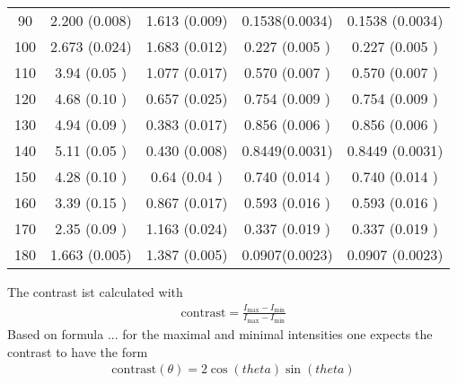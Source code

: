 \begin{table}[H]
\begin{tabular}{S S S S S}
		90                            & 2.200 (0.008)                 & 1.613 (0.009)                 & 0.1538(0.0034) & 0.1538 (0.0034) \\
		100                           & 2.673 (0.024)                 & 1.683 (0.012)                 & 0.227 (0.005 ) & 0.227 (0.005 )  \\
		110                           & 3.94  (0.05 )                 & 1.077 (0.017)                 & 0.570 (0.007 ) & 0.570 (0.007 )  \\
		120                           & 4.68  (0.10 )                 & 0.657 (0.025)                 & 0.754 (0.009 ) & 0.754 (0.009 )  \\
		130                           & 4.94  (0.09 )                 & 0.383 (0.017)                 & 0.856 (0.006 ) & 0.856 (0.006 )  \\
		140                           & 5.11  (0.05 )                 & 0.430 (0.008)                 & 0.8449(0.0031) & 0.8449 (0.0031) \\
		150                           & 4.28  (0.10 )                 & 0.64  (0.04 )                 & 0.740 (0.014 ) & 0.740 (0.014 )  \\
		160                           & 3.39  (0.15 )                 & 0.867 (0.017)                 & 0.593 (0.016 ) & 0.593 (0.016 )  \\
		170                           & 2.35  (0.09 )                 & 1.163 (0.024)                 & 0.337 (0.019 ) & 0.337 (0.019 )  \\
		180                           & 1.663 (0.005)                 & 1.387 (0.005)                 & 0.0907(0.0023) & 0.0907 (0.0023) \\
        
	\end{tabular}

\end{table}

The contrast ist calculated with
\begin{align}
    \text{contrast} = \frac{I_\text{max} -I_\text{min}}{I_\text{max}-I_\text{min}}
\end{align}
Based on formula ... for the maximal and minimal intensities one expects the contrast to have the form
\begin{align}
    \text{contrast}(\theta) = 2\cos(theta)\sin(theta) 
\end{align}



